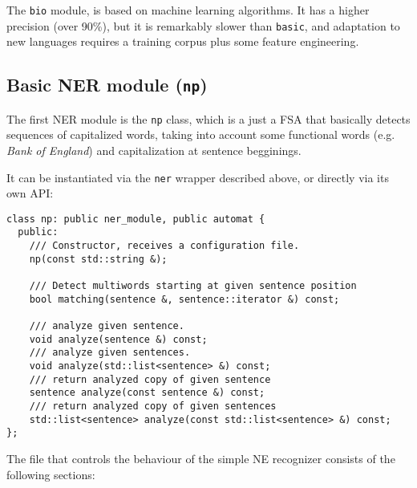 \documentclass[a4paper]{book}
\begin{document}
  The {\tt bio} module, is based on machine learning algorithms.  It
  has a higher precision (over 90\%), but it is remarkably slower than
  {\tt basic}, and adaptation to new languages requires a training
  corpus plus some feature engineering.

\subsection{Basic NER module ({\tt np}) }

  The first NER module is the {\tt np} class, which is a just a FSA
  that basically detects sequences of capitalized words, taking into
  account some functional words (e.g. {\em Bank of England}) and
  capitalization at sentence begginings.
  
 It can be instantiated via the {\tt ner} wrapper described above, or
 directly via its own API:
\begin{verbatim}
class np: public ner_module, public automat {
  public:
    /// Constructor, receives a configuration file.
    np(const std::string &); 

    /// Detect multiwords starting at given sentence position
    bool matching(sentence &, sentence::iterator &) const;

    /// analyze given sentence.
    void analyze(sentence &) const;
    /// analyze given sentences.
    void analyze(std::list<sentence> &) const;
    /// return analyzed copy of given sentence
    sentence analyze(const sentence &) const;
    /// return analyzed copy of given sentences
    std::list<sentence> analyze(const std::list<sentence> &) const;
};
\end{verbatim}

  The file that controls the behaviour of the simple NE recognizer
  consists of the following sections:
\end{document}
